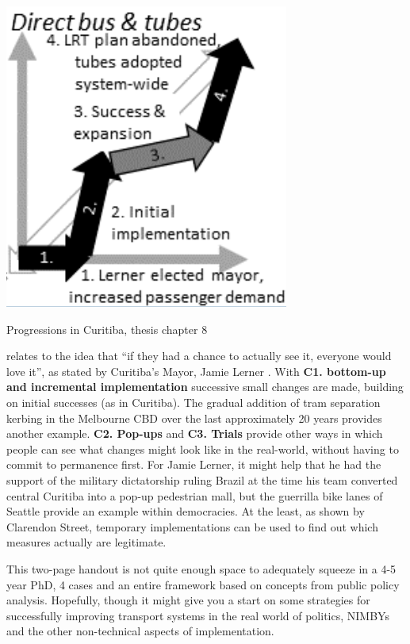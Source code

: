\documentclass{tufte-handout}
\begin{document}
\begin{marginfigure}
        \includegraphics[width=\linewidth]{Curitiba_3}
  \caption{Progressions in Curitiba, thesis chapter 8}
  \label{fig:Curitiba}
\end{marginfigure}

 relates to the idea that “if they had a chance to actually see it, everyone would love it”, as stated by Curitiba's Mayor, Jamie Lerner \citep{McKibben:2007aa}. With \textbf{C1. bottom-up and incremental implementation} successive small changes are made, building on initial successes (as in Curitiba). The gradual addition of tram separation kerbing in the Melbourne CBD over the last  approximately 20 years provides another example. \textbf{C2. Pop-ups} and \textbf{C3. Trials} provide other ways in which people can see what changes might look like in the real-world, without having to commit to permanence first.  For Jamie Lerner, it might help that he had the support of the military dictatorship ruling Brazil at the time his team converted central Curitiba into a pop-up pedestrian mall, but the guerrilla bike lanes of Seattle\citep{Fucoloro:2013aa} provide an example within democracies. At the least, as shown by Clarendon Street\citep{Silkstone:2005aa}, temporary implementations can be used to find out which measures actually are legitimate.

This two-page handout is not quite enough space to adequately squeeze in a 4-5 year PhD, 4 cases and an entire framework based on concepts from public policy analysis. Hopefully, though it might give you a start on some strategies for successfully improving transport systems in the real world of politics, NIMBYs and the other non-technical aspects of implementation. 



\end{document}
